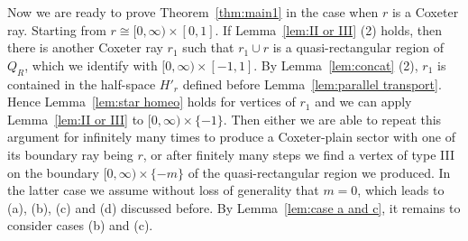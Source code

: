 \documentclass[11pt]{amsart}
\newcommand {\h}{\mathcal H}
\newcommand {\W}{\mathcal W}
\theoremstyle{definition}
\begin{document}

Now we are ready to prove Theorem~\ref{thm:main1} in the case when $r$ is a Coxeter ray. Starting from $r\cong[0,\infty)\times[0,1]$. If Lemma~\ref{lem:II or III} (2) holds, then there is another Coxeter ray $r_1$ such that $r_1\cup r$ is a quasi-rectangular region of $Q_R$, which we identify with $[0,\infty)\times[-1,1]$. By Lemma~\ref{lem:concat} (2), $r_1$ is contained in the half-space $H'_r$ defined before Lemma~\ref{lem:parallel transport}. Hence Lemma~\ref{lem:star homeo} holds for vertices of $r_1$ and we can apply Lemma~\ref{lem:II or III} to $[0,\infty)\times\{-1\}$. Then either we are able to repeat this argument for infinitely many times to produce a Coxeter-plain sector with one of its boundary ray being $r$, or after finitely many steps we find a vertex of type III on the boundary $[0,\infty)\times\{-m\}$ of the quasi-rectangular region we produced. In the latter case we assume without loss of generality that $m=0$, which leads to (a), (b), (c) and (d) discussed before. By Lemma~\ref{lem:case a and c}, it remains to consider cases (b) and (c).
\end{document}
